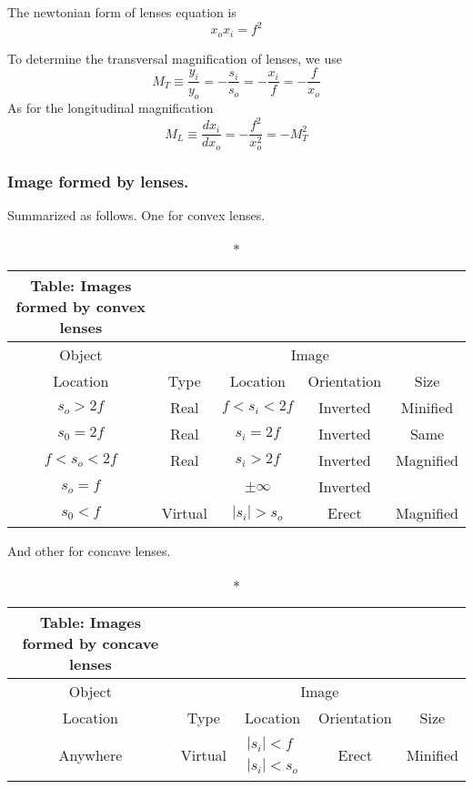 \documentclass[../../../main.tex]{subfiles}
\begin{document}
The newtonian form of lenses equation is 
\begin{equation*}
    x_ox_i=f^2
\end{equation*}

To determine the transversal magnification of lenses, we use 
\begin{equation*}
    M_T\equiv \frac{y_i}{y_o}=-\frac{s_i}{s_o}=-\frac{x_i}{f}=-\frac{f}{x_o}
\end{equation*}
As for the longitudinal magnification
\begin{equation*}
    M_L\equiv \frac{dx_i}{dx_o}=-\frac{f^2}{x_o^2}=-M_T^2
\end{equation*}

\subsubsection*{Image formed by lenses.} Summarized as follows. One for convex lenses.
\begin{longtable}{c | c | c | c | c}
    \caption*{Table: Images formed by convex lenses}\\
    \hline
    Object & \multicolumn{4}{c}{Image}\\
    \hline
    Location & Type & Location & Orientation & Size\\
    \hline\hline
    $s_o>2f$ &Real &$f<s_i<2f$ &Inverted &Minified \\
    $s_0=2f$ &Real &$s_i=2f$ &Inverted &Same \\
    $f<s_o<2f$ &Real &$s_i>2f$ &Inverted &Magnified \\
    $s_o=f$ & &$\pm \infty$ &Inverted & \\
    $s_0<f$ &Virtual &$|s_i|>s_o$ &Erect &Magnified \\
    \hline
\end{longtable}

And other for concave lenses.
\begin{longtable}{c | c | c | c | c}
    \caption*{Table: Images formed by concave lenses}\\
    \hline
    Object & \multicolumn{4}{c}{Image}\\
    \hline
    Location & Type & Location & Orientation & Size\\
    \hline\hline
    Anywhere &Virtual &$\begin{matrix}|s_i|<f \\|s_i|<s_o\end{matrix}$ &Erect &Minified \\
    \hline
\end{longtable}
\end{document}
